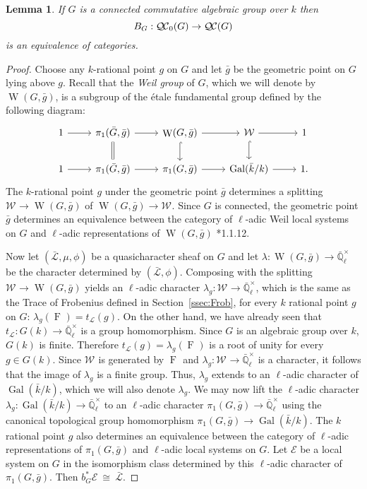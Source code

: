 \documentclass[CM,Submssn,SecEq]{degruyter-crelle} %
\theoremstyle{plain}
\newtheorem{lemma}[theorem]{Lemma}
\theoremstyle{definition}
\theoremstyle{remark}
\newcommand{\EE}{\mathbb{\bar Q}_\ell}
\newcommand{\bFq}{\bar{k}}
\newcommand{\Fq}{k}
\newcommand{\EEx}{\EE^\times}
\newcommand{\Weil}[1]{\mathcal{W}_{#1}}
\DeclareMathOperator{\Gal}{Gal}
\DeclareMathOperator{\W}{W}
\newcommand{\Frob}[1]{\operatorname{F}_{#1}}
\newcommand{\iso}{{\ \cong\ }}
\newcommand{\trFrob}[1]{t_{#1}}
\newcommand{\qcs}[1]{{\mathcal{#1}}}
\newcommand{\gqcs}[1]{{\mathcal{\bar #1}}}
\newcommand{\QC}{{\mathcal{Q\hskip-0.8pt C}}}
\newcommand{\bQC}{{\QC_0}}
\newcommand{\bg}{\bar{g}}
\newcommand{\bG}{\bar{G}}
\begin{document}
\begin{lemma}\label{lem:bounded_connected}
If $G$ is a connected commutative algebraic group over $\Fq$ then 
\[
B_G : \bQC(G) \to \QC(G)
\]
 is an equivalence of categories.
\end{lemma}

\begin{proof}
Choose any $\Fq$-rational point $g$ on $G$ and let $\bg$ be the geometric point on $G$ lying above $g$.
Recall that the \emph{Weil group} of $G$, which we will denote by $\W(G,\bg)$, is a subgroup of the \'etale
fundamental group defined by the following diagram:
\[
 \begin{tikzcd}
 1 \rar & \ar[equal]{d} \pi_1(\bG, \bg) \rar & \W(G,\bg) \rar \dar[hook] & \Weil{} \rar \dar[hook] & 1 \\
 1 \rar &  \pi_1(\bG, \bg) \rar & \pi_1(G,\bg) \rar & \Gal(\bFq/\Fq) \rar & 1.
 \end{tikzcd}
\]
The $\Fq$-rational point $g$ under the geometric point $\bg$ determines a splitting
$\Weil{}\to \W(G,\bg)$ of $\W(G,\bg)\to \Weil{}$.
%
  Since $G$ is connected, the geometric point $\bg$ determines
  an equivalence between the category of $\ell$-adic Weil local systems on $G$ and
  $\ell$-adic representations of $\W(G,\bg)$ \cite{deligne:80a}*{1.1.12}.
  
  Now let $(\gqcs{L},\mu,\phi)$ be a quasicharacter sheaf on $G$
  and let $\lambda : \W(G, \bg) \to \EEx$ be the character determined by $(\gqcs{L},\phi)$.
  Composing with the splitting $\Weil{} \to \W(G,\bg)$ yields an $\ell$-adic character
  $\lambda_g : \Weil{} \to \EEx$, which is the same as the Trace of Frobenius defined in Section~\ref{ssec:Frob}, for every $\Fq$ rational point $g$ on $G$:
  $
  \lambda_g(\Frob{}) =  \trFrob{\qcs{L}}(g).
  $
%
  On the other hand, we have already seen that $\trFrob{\qcs{L}} : G(\Fq) \to \EEx$
  is a group homomorphism. 
  Since $G$ is an algebraic group over $\Fq$, $G(\Fq)$ is finite.
  Therefore $\trFrob{\qcs{L}}(g) = \lambda_g(\Frob{})$ is a root of unity
  for every $g\in G(\Fq)$.  Since $\Weil{}$ is generated by
  $\Frob{}$ and $\lambda_g : \Weil{} \to \EEx$ is
  a character, it follows that the image of $\lambda_g$ is a finite group.
  Thus, $\lambda_g$ extends to an $\ell$-adic character of $\Gal(\bFq/\Fq)$,
  which we will also denote $\lambda_g$.
%
  We may now lift the $\ell$-adic character $\lambda_g : \Gal(\bFq/\Fq) \to \EEx$
  to an $\ell$-adic character $\pi_1(G,\bg) \to \EEx$ using the canonical topological group homomorphism
  $\pi_1(G,\bg) \to \Gal(\bFq/\Fq)$. 
  The $\Fq$ rational point $g$ also
  determines an equivalence between the category of $\ell$-adic
  representations of $\pi_1(G,\bg)$ and $\ell$-adic local systems on $G$. Let
  $\qcs{E}$ be a local system on $G$ in the isomorphism class
  determined by this $\ell$-adic character of $\pi_1(G,\bg)$.
  Then $b_G^*\qcs{E} \iso \gqcs{L}$.
  

\end{proof}
\end{document}
